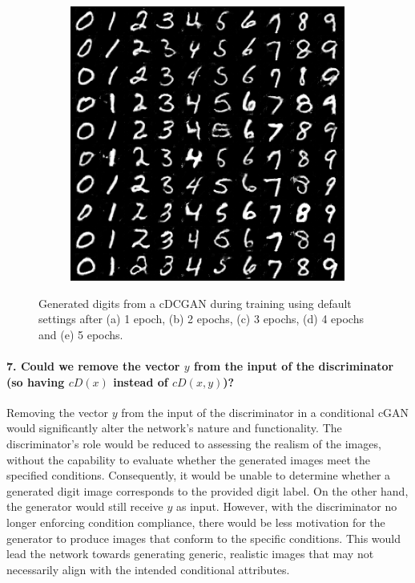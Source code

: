 \begin{figure}[H]
\begin{subfigure}{0.2\textwidth}
        \caption{}
        \label{subfig:cDCGAN/fake_sample_epoch_0004}
    \end{subfigure}%
    \begin{subfigure}{0.2\textwidth}
        \centering
        \includegraphics[width=0.95\linewidth]{cDCGAN/fake_sample_epoch_0005.png}
        \caption{}
        \label{subfig:cDCGAN/fake_sample_epoch_0005}
    \end{subfigure}

    

    \caption{Generated digits from a cDCGAN during training using default settings after (a) 1 epoch, (b) 2 epochs, (c) 3 epochs, (d) 4 epochs and (e) 5 epochs.}
    \label{fig:cDCGAN_default}
\end{figure}


\paragraph*{7. Could we remove the vector $y$ from the input of the discriminator (so having $cD(x)$ instead of $cD(x, y)$)?}

Removing the vector $y$ from the input of the discriminator in a conditional cGAN would significantly alter the network's nature and functionality. The discriminator's role would be reduced to assessing the realism of the images, without the capability to evaluate whether the generated images meet the specified conditions. Consequently, it would be unable to determine whether a generated digit image corresponds to the provided digit label. On the other hand, the generator would still receive $y$ as input. However, with the discriminator no longer enforcing condition compliance, there would be less motivation for the generator to produce images that conform to the specific conditions. This would lead the network towards generating generic, realistic images that may not necessarily align with the intended conditional attributes.

